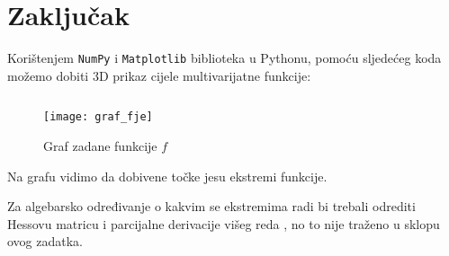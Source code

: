 \chapter{Zaključak}

Korištenjem \verb|NumPy| i \verb|Matplotlib| biblioteka u Pythonu, pomoću sljedećeg koda možemo dobiti 3D prikaz cijele multivarijatne funkcije:

\inputminted{python}{./code/graf_fje.py}

\begin{figure}
    \centering
    \texttt{[image: graf\_fje]}
    \caption{Graf zadane funkcije $f$}
\end{figure}

Na grafu vidimo da dobivene točke jesu ekstremi funkcije. \par
Za algebarsko određivanje o kakvim se ekstremima radi bi trebali odrediti Hessovu matricu i parcijalne derivacije višeg reda \cite[][poglavlje 6.3]{ccalc}, no to nije traženo u sklopu ovog zadatka.

\newpage
